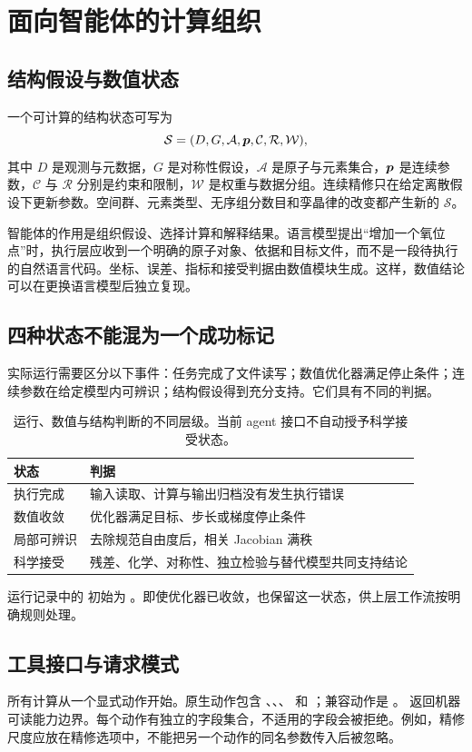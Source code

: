 \chapter{面向智能体的计算组织}
\section{结构假设与数值状态}
一个可计算的结构状态可写为
\begin{equation}
\mathcal S=(D,G,\mathcal A,\bm{p},\mathcal C,\mathcal R,\mathcal W),
\end{equation}
其中 $D$ 是观测与元数据，$G$ 是对称性假设，$\mathcal A$ 是原子与元素集合，$\bm{p}$ 是连续参数，$\mathcal C$ 与 $\mathcal R$ 分别是约束和限制，$\mathcal W$ 是权重与数据分组。连续精修只在给定离散假设下更新参数。空间群、元素类型、无序组分数目和孪晶律的改变都产生新的 $\mathcal S$。

智能体的作用是组织假设、选择计算和解释结果。语言模型提出“增加一个氧位点”时，执行层应收到一个明确的原子对象、依据和目标文件，而不是一段待执行的自然语言代码。坐标、误差、指标和接受判据由数值模块生成。这样，数值结论可以在更换语言模型后独立复现。

\section{四种状态不能混为一个成功标记}
实际运行需要区分以下事件：任务完成了文件读写；数值优化器满足停止条件；连续参数在给定模型内可辨识；结构假设得到充分支持。它们具有不同的判据。

\begin{table}[htbp]
\centering\small
\begin{tabularx}{\textwidth}{p{29mm}X}
\toprule 状态 & 判据\\\midrule
执行完成 & 输入读取、计算与输出归档没有发生执行错误\\
数值收敛 & 优化器满足目标、步长或梯度停止条件\\
局部可辨识 & 去除规范自由度后，相关 Jacobian 满秩\\
科学接受 & 残差、化学、对称性、独立检验与替代模型共同支持结论\\
\bottomrule
\end{tabularx}
\caption{运行、数值与结构判断的不同层级。当前 agent 接口不自动授予科学接受状态。}
\end{table}
运行记录中的  初始为 。即使优化器已收敛，也保留这一状态，供上层工作流按明确规则处理。

\section{工具接口与请求模式}
所有计算从一个显式动作开始。原生动作包含 、、、 和 ；兼容动作是 。 返回机器可读能力边界。每个动作有独立的字段集合，不适用的字段会被拒绝。例如，精修尺度应放在精修选项中，不能把另一个动作的同名参数传入后被忽略。

